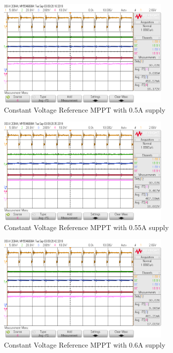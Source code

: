 \documentclass[]{article}
\begin{document}
				\begin{figure}[H]
					\centering
					\includegraphics[width=0.75\textwidth]{Lab3Results/0_50A_Supply}
					\caption{Constant Voltage Reference MPPT with 0.5A supply}
					\label{fig:Lab3_0.5A}
				\end{figure}
				\begin{figure}[H]
					\centering
					\includegraphics[width=0.75\textwidth]{Lab3Results/0_55A_Supply}
					\caption{Constant Voltage Reference MPPT with 0.55A supply}
					\label{fig:Lab3_0.55A}
				\end{figure}
				\begin{figure}[H]
					\centering
					\includegraphics[width=0.75\textwidth]{Lab3Results/0_60A_Supply}
					\caption{Constant Voltage Reference MPPT with 0.6A supply}
					\label{fig:Lab3_0.6A}
				\end{figure}
		\newpage
\end{document}
